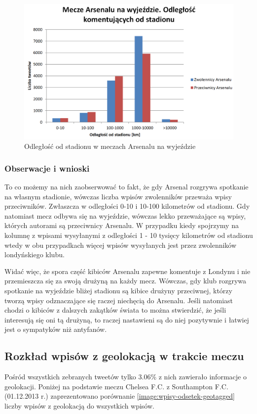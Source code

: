 \begin{figure}[ht!]
\centering
\includegraphics[width=140mm]{img//odleglosc-od-stadionu-away.png}
\caption{Odległość od stadionu w meczach Arsenalu na wyjeździe}
\label{image:odleglosc-od-stadionu-gosc}
\end{figure}

\subsubsection{Obserwacje i wnioski}
To co możemy na nich zaobserwować to fakt, że gdy Arsenal rozgrywa spotkanie na własnym
stadionie, wówczas liczba wpisów zwolenników przeważa wpisy przeciwników.
Zwłaszcza w odległości 0-10 i 10-100 kilometrów od stadionu.
Gdy natomiast mecz odbywa się na wyjeździe, wówczas lekko przeważające
są wpisy, których autorami są przeciwnicy Arsenalu.
W przypadku kiedy spojrzymy na kolumnę z wpisami wysyłanymi z odległości
1 - 10 tysięcy kilometrów od stadionu wtedy w obu przypadkach
więcej wpisów wysyłanych jest przez zwolenników londyńskiego klubu.

Widać więc, że spora część kibiców Arsenalu zapewne komentuje z Londynu
i nie przemieszcza się za swoją drużyną na każdy mecz. Wówczas, gdy klub rozgrywa
spotkanie na wyjeździe bliżej stadionu są kibice drużyny przeciwnej,
którzy tworzą wpisy odznaczające się raczej niechęcią do Arsenalu. 
Jeśli natomiast
chodzi o kibiców z dalszych zakątków świata to można stwierdzić, że
jeśli interesują się oni tą drużyną, to raczej nastawieni są do niej pozytywnie
i łatwiej jest o sympatyków niż antyfanów.


\clearpage
\subsection{Rozkład wpisów z geolokacją w trakcie meczu}
Pośród wszystkich zebranych tweetów tylko 3.06\% z nich zawierało informacje o
geolokacji. Poniżej na podstawie meczu Chelsea F.C. z Southampton F.C.
(01.12.2013 r.) zaprezentowano porównanie \ref{image:wpisy-odsetek-geotagged}
liczby wpisów z geolokacją do wszystkich wpisów.

